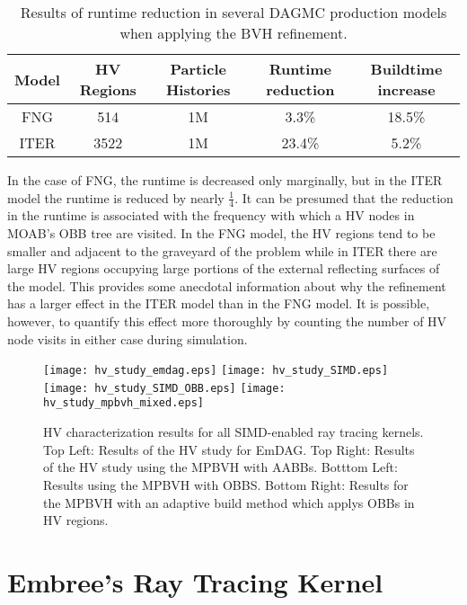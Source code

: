 \begin{table}[H]
  \centering
  \begin{tabular}{c c c c c}
    \toprule
    \textbf{Model} & \textbf{HV Regions} & \textbf{Particle Histories} & \textbf{Runtime reduction} & \textbf{Buildtime increase} \\
    \hline
    FNG            & 514                 & 1M                          & 3.3\%                      & 18.5\%                      \\
    ITER           & 3522                & 1M                          & 23.4\%                     & 5.2\%                       \\
    \bottomrule
  \end{tabular}
  \caption{Results of runtime reduction in several DAGMC production models when applying the BVH refinement.}
  \label{tab:bvhrefine_production_results}
\end{table}    

In the case of FNG, the runtime is decreased only marginally, but in the ITER
model the runtime is reduced by nearly $\frac{1}{4}$. It can be presumed that
the reduction in the runtime is associated with the frequency with which a HV
nodes in MOAB's OBB tree are visited. In the FNG model, the HV regions tend to
be smaller and adjacent to the graveyard of the problem while in ITER there are
large HV regions occupying large portions of the external reflecting surfaces of
the model. This provides some anecdotal information about why the refinement has
a larger effect in the ITER model than in the FNG model. It is possible,
however, to quantify this effect more thoroughly by counting the number of HV
node visits in either case during simulation.

\begin{sidewaysfigure}
  \centering
  \texttt{[image: hv\_study\_emdag.eps]}
  \texttt{[image: hv\_study\_SIMD.eps]}
  \texttt{[image: hv\_study\_SIMD\_OBB.eps]}
  \texttt{[image: hv\_study\_mpbvh\_mixed.eps]}
  \caption{HV characterization results for all SIMD-enabled ray tracing
    kernels. Top Left: Results of the HV study for EmDAG. Top Right: Results of
    the HV study using the MPBVH with AABBs. Botttom Left: Results using the
    MPBVH with OBBS. Bottom Right: Results for the MPBVH with an adaptive build
    method which applys OBBs in HV regions.}
  \label{fig:simd_hv_studies}
\end{sidewaysfigure}

\section{Embree's Ray Tracing Kernel}\label{sec:emdag_hv_study}

